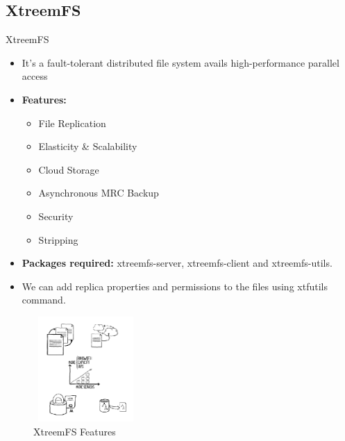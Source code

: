 \documentclass[10pt,xcolor=dvipsnames]{beamer}
\begin{document}
\subsection{XtreemFS}
\begin{frame}{XtreemFS}
\begin{multicols}{2}
\begin{flushleft}

		\begin{itemize}
			\item  It’s a fault-tolerant distributed file system avails high-performance parallel access
			\item \textbf{Features:}
			\begin{itemize}
				\item  File Replication
 				\item Elasticity \& Scalability
 				\item Cloud Storage
				\item Asynchronous MRC Backup
				\item Security
				\item Stripping
			\end{itemize}

 			\item \textbf{Packages required:} xtreemfs-server, xtreemfs-client and xtreemfs-utils.
 			\item We can add replica properties and permissions to the files using xtfutils command.
		\end{itemize}

\end{flushleft}
\begin{flushright}

		\begin{figure}[H]
		\begin{center}
		\includegraphics[width=4cm,height=4cm]{xtreem.png}
		\caption{XtreemFS Features}
		\end{center}
		\end{figure}
	

\end{flushright}
\end{multicols}
\end{frame}
\end{document}

